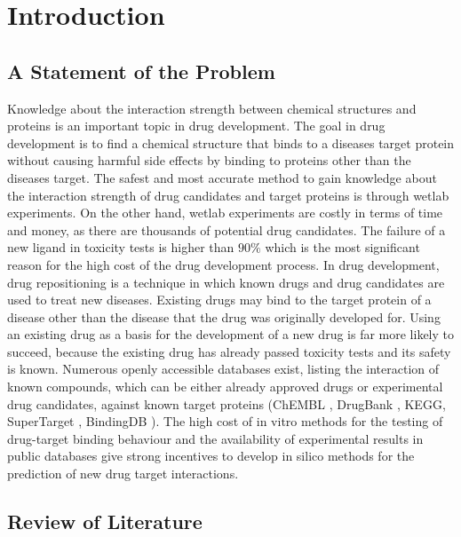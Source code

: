 
\chapter{Introduction}

\section{A Statement of the Problem}

Knowledge about the interaction strength between chemical structures and proteins is an important topic in drug development.
The goal in drug development is to find a chemical structure that binds to a diseases target protein without causing harmful side effects by binding to proteins other than the diseases target.
The safest and most accurate method to gain knowledge about the interaction strength of drug candidates and target proteins is through wetlab experiments. On the other hand, wetlab experiments are costly in terms of time and money, as there are thousands of potential drug candidates. The failure of a new ligand in toxicity tests is higher than $90\%$ which is the most significant reason for the high cost of the drug development process. In drug development, drug repositioning is a technique in which known drugs and drug candidates are used to treat new diseases. Existing drugs may bind to the target protein of a disease other than the disease that the drug was originally developed for. Using an existing drug as a basis for the development of a new drug is far more likely to succeed, because the existing drug has already passed toxicity tests and its safety is known. Numerous openly accessible databases exist, listing the interaction of known compounds, which can be either already approved drugs or experimental drug candidates, against known target proteins (ChEMBL \cite{gaulton2012chembl}, DrugBank \cite{wishart2008drugbank}, KEGG\cite{kanehisa2011kegg}, SuperTarget \cite{gunther2008supertarget}, BindingDB \cite{liu2007bindingdb}). The high cost of in vitro methods for the testing of drug-target binding behaviour and the availability of experimental results in public databases give strong incentives to develop in silico methods for the prediction of new drug target interactions.



\section{Review of Literature}

